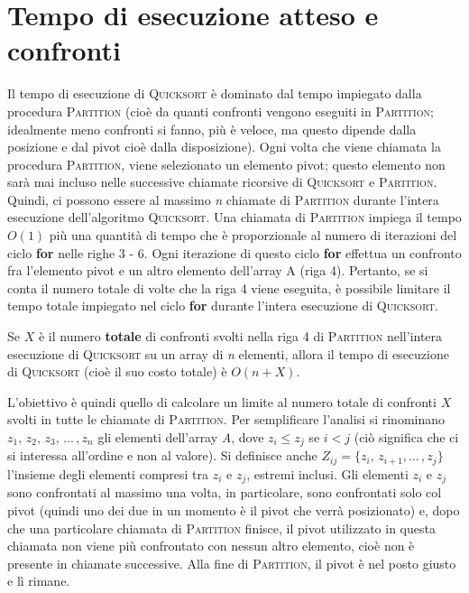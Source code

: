 \documentclass[10pt, a4paper]{report}
\begin{document}
\section{Tempo di esecuzione atteso e confronti}
Il tempo di esecuzione di \textsc{Quicksort} è dominato dal tempo impiegato dalla procedura \textsc{Partition} (cioè da quanti confronti vengono eseguiti in \textsc{Partition}; idealmente meno confronti si fanno, più è veloce, ma questo dipende dalla posizione e dal pivot cioè dalla disposizione). Ogni volta che viene chiamata la procedura \textsc{Partition}, viene selezionato un elemento pivot; questo elemento non sarà mai incluso nelle successive chiamate ricorsive di \textsc{Quicksort} e \textsc{Partition}. Quindi, ci possono essere al massimo \textit{n} chiamate di \textsc{Partition} durante l'intera esecuzione dell'algoritmo \textsc{Quicksort}. Una chiamata di \textsc{Partition} impiega il tempo $O(1)$ più una quantità di tempo che è proporzionale al numero di iterazioni del ciclo \textbf{for} nelle righe 3 - 6. Ogni iterazione di questo ciclo \textbf{for} effettua un confronto fra l'elemento pivot e un altro elemento dell'array A (riga 4). Pertanto, se si conta il numero totale di volte che la riga 4 viene eseguita, è possibile limitare il tempo totale impiegato nel ciclo \textbf{for} durante l'intera esecuzione di \textsc{Quicksort}.

Se $X$ è il numero \textbf{totale} di confronti svolti nella riga 4 di \textsc{Partition} nell'intera esecuzione di \textsc{Quicksort} su un array di \textit{n} elementi, allora il tempo di esecuzione di \textsc{Quicksort} (cioè il suo costo totale) è $O(n + X)$.

L'obiettivo è quindi quello di calcolare un limite al numero totale di confronti $X$ svolti in tutte le chiamate di \textsc{Partition}. Per semplificare l'analisi si rinominano $z_1,\,z_2,\,z_3,\,...\,,z_n$ gli elementi dell'array \textit{A}, dove $z_i \leq z_j$ se $i < j$ (ciò significa che ci si interessa all'ordine e non al valore). Si definisce anche $Z_{ij} = \{z_i,\,z_{i+1},...\,,z_j\}$ l'insieme degli elementi compresi tra $z_i$ e $z_j$, estremi inclusi. Gli elementi $z_i$ e $z_j$ sono confrontati al massimo una volta, in particolare, sono confrontati solo col pivot (quindi uno dei due in un momento è il pivot che verrà posizionato) e, dopo che una particolare chiamata di \textsc{Partition} finisce, il pivot utilizzato in questa chiamata non viene più confrontato con nessun altro elemento, cioè non è presente in chiamate successive. Alla fine di \textsc{Partition}, il pivot è nel posto giusto e lì rimane. 
\end{document}
